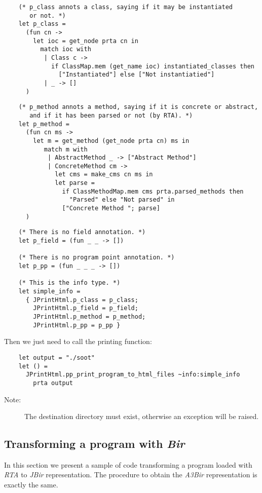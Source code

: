 \documentclass{article}
\begin{document}
\begin{verbatim}
    (* p_class annots a class, saying if it may be instantiated
       or not. *)
    let p_class =
      (fun cn ->
        let ioc = get_node prta cn in
          match ioc with
           | Class c ->
             if ClassMap.mem (get_name ioc) instantiated_classes then
               ["Instantiated"] else ["Not instantiatied"]
           | _ -> []
      )
\end{verbatim}
\begin{verbatim}
    (* p_method annots a method, saying if it is concrete or abstract,
       and if it has been parsed or not (by RTA). *)
    let p_method =
      (fun cn ms ->
        let m = get_method (get_node prta cn) ms in
           match m with
            | AbstractMethod _ -> ["Abstract Method"]
            | ConcreteMethod cm ->
              let cms = make_cms cn ms in
              let parse =
                if ClassMethodMap.mem cms prta.parsed_methods then
                  "Parsed" else "Not parsed" in
                ["Concrete Method "; parse]
      )
\end{verbatim}
\begin{verbatim}
    (* There is no field annotation. *)
    let p_field = (fun _ _ -> [])

    (* There is no program point annotation. *)
    let p_pp = (fun _ _ _ -> [])

    (* This is the info type. *)
    let simple_info = 
      { JPrintHtml.p_class = p_class;
        JPrintHtml.p_field = p_field;
        JPrintHtml.p_method = p_method;
        JPrintHtml.p_pp = p_pp }
\end{verbatim}
Then we just need to call the printing function:

\begin{verbatim}
    let output = "./soot"
    let () =
      JPrintHtml.pp_print_program_to_html_files ~info:simple_info
        prta output
\end{verbatim}
\begin{description}
\item[Note:]
The destination directory must exist, otherwise an exception will
be raised.
\end{description}
\subsection{Transforming a program with \emph{Bir}}

In this section we present a sample of code transforming a program
loaded with \emph{RTA} to \emph{JBir} representation. The procedure
to obtain the \emph{A3Bir} representation is exactly the same.
\end{document}
